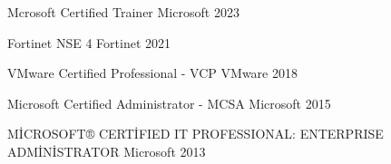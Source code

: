 

\begin{cvhonors}

  \cvhonor
    {Mcrosoft Certified Trainer} %
    {Microsoft} %
    {} %
    {2023} %

  \cvhonor
    {Fortinet NSE 4} %
    {Fortinet} %
    {} %
    {2021} %

  \cvhonor
    {VMware Certified Professional - VCP} %
    {VMware} %
    {} %
    {2018} %

  \cvhonor
    {Microsoft Certified Administrator - MCSA } %
    {Microsoft} %
    {} %
    {2015} %

  \cvhonor
    {MİCROSOFT® CERTİFIED IT PROFESSIONAL: ENTERPRISE ADMİNİSTRATOR } %
    {Microsoft} %
    {} %
    {2013} %

  
\end{cvhonors}

